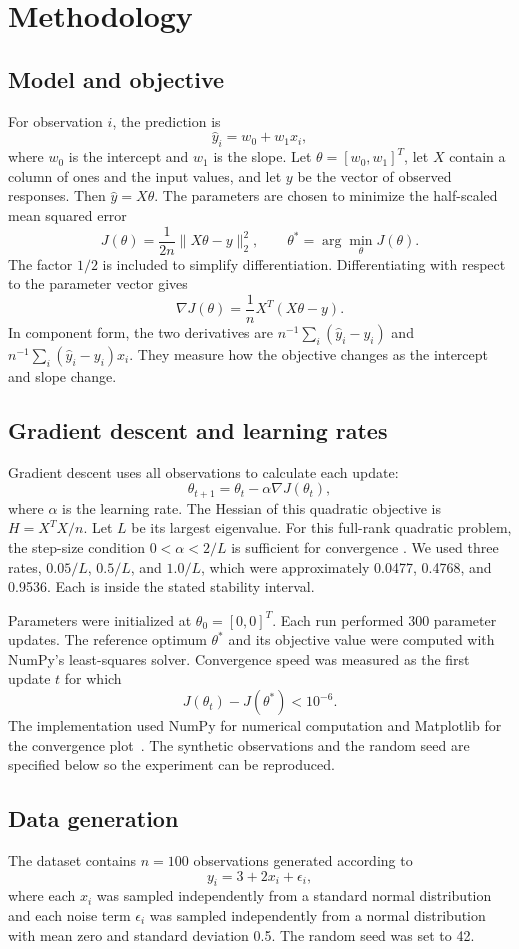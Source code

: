 \documentclass[11pt,onecolumn]{article}
\begin{document}
\section{Methodology}
\subsection{Model and objective}
For observation $i$, the prediction is
\[
\hat y_i=w_0+w_1x_i,
\]
where $w_0$ is the intercept and $w_1$ is the slope. Let $\theta=[w_0,w_1]^T$, let $X$ contain a column of ones and the input values, and let $y$ be the vector of observed responses. Then $\hat y=X\theta$. The parameters are chosen to minimize the half-scaled mean squared error
\[
J(\theta)=\frac{1}{2n}\|X\theta-y\|_2^2,
\qquad
\theta^*=\arg\min_{\theta}J(\theta).
\]
The factor $1/2$ is included to simplify differentiation. Differentiating with respect to the parameter vector gives
\[
\nabla J(\theta)=\frac{1}{n}X^T(X\theta-y).
\]
In component form, the two derivatives are $n^{-1}\sum_i(\hat y_i-y_i)$ and $n^{-1}\sum_i(\hat y_i-y_i)x_i$. They measure how the objective changes as the intercept and slope change.

\subsection{Gradient descent and learning rates}
Gradient descent uses all observations to calculate each update:
\[
\theta_{t+1}=\theta_t-\alpha\nabla J(\theta_t),
\]
where $\alpha$ is the learning rate. The Hessian of this quadratic objective is $H=X^TX/n$. Let $L$ be its largest eigenvalue. For this full-rank quadratic problem, the step-size condition $0<\alpha<2/L$ is sufficient for convergence \cite{chong2023optimization}. We used three rates, $0.05/L$, $0.5/L$, and $1.0/L$, which were approximately 0.0477, 0.4768, and 0.9536. Each is inside the stated stability interval.

Parameters were initialized at $\theta_0=[0,0]^T$. Each run performed 300 parameter updates. The reference optimum $\theta^*$ and its objective value were computed with NumPy's least-squares solver. Convergence speed was measured as the first update $t$ for which
\[
J(\theta_t)-J(\theta^*)<10^{-6}.
\]
The implementation used NumPy for numerical computation and Matplotlib for the convergence plot~\cite{harris2020,hunter2007}. The synthetic observations and the random seed are specified below so the experiment can be reproduced.

\subsection{Data generation}
The dataset contains $n=100$ observations generated according to
\[
y_i=3+2x_i+\epsilon_i,
\]
where each $x_i$ was sampled independently from a standard normal distribution and each noise term $\epsilon_i$ was sampled independently from a normal distribution with mean zero and standard deviation 0.5. The random seed was set to 42. 
\end{document}
